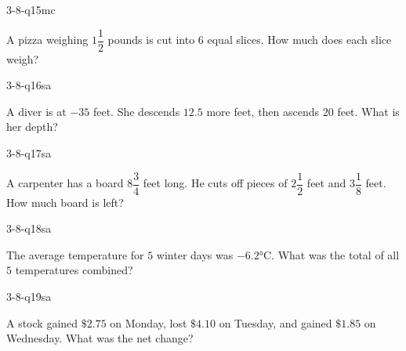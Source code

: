 \begin{practiceQuestion}{3-8-q15}{mc}
\begin{questionText}
A pizza weighing $1\dfrac{1}{2}$ pounds is cut into $6$ equal slices. How much does each slice weigh?
\end{questionText}
\end{practiceQuestion}


\begin{practiceQuestion}{3-8-q16}{sa}
\begin{questionText}
A diver is at $-35$ feet. She descends $12.5$ more feet, then ascends $20$ feet. What is her depth?
\end{questionText}
\end{practiceQuestion}

\begin{practiceQuestion}{3-8-q17}{sa}
\begin{questionText}
A carpenter has a board $8\dfrac{3}{4}$ feet long. He cuts off pieces of $2\dfrac{1}{2}$ feet and $3\dfrac{1}{8}$ feet. How much board is left?
\end{questionText}
\end{practiceQuestion}

\begin{practiceQuestion}{3-8-q18}{sa}
\begin{questionText}
The average temperature for $5$ winter days was $-6.2°$C. What was the total of all $5$ temperatures combined?
\end{questionText}
\end{practiceQuestion}

\begin{practiceQuestion}{3-8-q19}{sa}
\begin{questionText}
A stock gained $\$2.75$ on Monday, lost $\$4.10$ on Tuesday, and gained $\$1.85$ on Wednesday. What was the net change?
\end{questionText}
\end{practiceQuestion}

